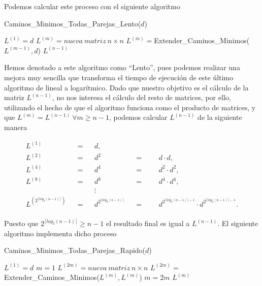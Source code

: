 Podemos calcular este proceso con el siguiente algoritmo

\begin{breakablealgorithm}
	\caption{Caminos\_Minimos\_Todas\_Parejas\_Lento($d$)}
	\begin{algorithmic}[1]
		\State $L^{(1)}=d$
			\State $L^{(m)}=nueva\ matriz\ n\times n$
			\State $L^{(m)}=$Extender\_Caminos\_Minimos($L^{(m-1)},d$)
		\EndFor
		\Return $L^{(n-1)}$
	\end{algorithmic}
\end{breakablealgorithm}

Hemos denotado a este algoritmo como ``Lento'', pues podemos realizar una mejora muy sencilla que transforma el tiempo de ejecución de este último algoritmo de lineal a logarítmico. Dado que nuestro objetivo es el cálculo de la matriz $L^{(n-1)}$, no nos interesa el cálculo del resto de matrices, por ello, utilizando el hecho de que el algoritmo funciona como el producto de matrices, y que $L^{(m)}=L^{(n-1)}\ \forall m\geq n-1$, podemos calcular $L^{(n-1)}$ de la siguiente manera

\begin{adjustwidth}{3.5cm}{10cm}
	\begin{align*}
		L^{(1)} &&=&&  d, \\
		L^{(2)} &&=&&   d^2 &&=&& & d\cdot d,\\
		L^{(4)} &&=&&   d^4 &&=&&  &d^2\cdot d^2,\\
		L^{(8)} &&=&&   d^8 &&=&&  &d^4\cdot d^4,\\
		&&&& \vdots \\
		L^{(2^{\lceil log_2(n-1)\rceil })} &&=&& d^{2^{\lceil log_2(n-1)\rceil }} &&=&&  &d^{2^{\lceil log_2(n-1)\rceil -1}}\cdot d^{2^{\lceil log_2(n-1)\rceil -1}}.\\
	\end{align*}
\end{adjustwidth}

Puesto que $2^{\lceil log_2(n-1)\rceil}\geq n-1$ el resultado final es igual a $L^{(n-1)}$. El siguiente algoritmo implementa dicho proceso

\begin{breakablealgorithm}
	\caption{Caminos\_Minimos\_Todas\_Parejas\_Rapido($d$)}
	\begin{algorithmic}[1]
		\State $L^{(1)}=d$
		\State $m=1$
			\State $L^{(2m)}=nueva\ matriz\ n\times n$
			\State $L^{(2m)}=$Extender\_Caminos\_Minimos($L^{(m)},L^{(m)}$)
			\State $m=2m$
		\EndWhile
		\Return $L^{(m)}$
	\end{algorithmic}
\end{breakablealgorithm}

